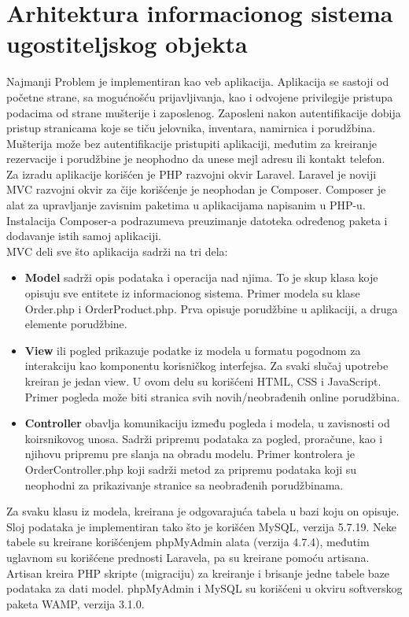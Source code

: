 \documentclass{article}
\begin{document}
\section{Arhitektura informacionog sistema ugostiteljskog objekta}
Najmanji Problem je implementiran kao veb aplikacija. Aplikacija se sastoji od početne strane, sa mogućnošću prijavljivanja, kao i odvojene privilegije pristupa podacima od strane mušterije i zaposlenog. Zaposleni nakon autentifikacije dobija pristup stranicama koje se tiču jelovnika, inventara, namirnica i porudžbina. Mušterija može bez autentifikacije pristupiti aplikaciji, međutim za kreiranje rezervacije i porudžbine je neophodno da unese mejl adresu ili kontakt telefon.\\

Za izradu aplikacije korišćen je PHP razvojni okvir Laravel. Laravel je noviji MVC razvojni okvir za čije korišćenje je neophodan je Composer. Composer je alat za upravljanje zavisnim paketima u aplikacijama napisanim u PHP-u. Instalacija Composer-a podrazumeva preuzimanje datoteka određenog paketa i dodavanje istih samoj aplikaciji.\\

MVC deli sve što aplikacija sadrži na tri dela:
\begin{itemize}
	\item \textbf{Model} sadrži opis podataka i operacija nad njima. To je skup klasa koje opisuju sve entitete iz informacionog sistema. Primer modela su klase Order.php i OrderProduct.php. Prva opisuje porudžbine u aplikaciji, a druga elemente porudžbine.
	\item \textbf{View} ili pogled prikazuje podatke iz modela u formatu pogodnom za interakciju kao komponentu korisničkog interfejsa. Za svaki slučaj upotrebe kreiran je jedan view. U ovom delu su korišćeni HTML, CSS i JavaScript. Primer pogleda može biti stranica svih novih/neobrađenih online porudžbina.
	\item \textbf{Controller} obavlja komunikaciju između pogleda i modela, u zavisnosti od koirsnikovog unosa. Sadrži pripremu podataka za pogled, proračune, kao i njihovu pripremu pre slanja na obradu modelu. Primer kontrolera je OrderController.php koji sadrži metod za pripremu podataka koji su neophodni za prikazivanje stranice sa neobrađenih porudžbinama.
\end{itemize}

Za svaku klasu iz modela, kreirana je odgovarajuća tabela u bazi koju on opisuje. Sloj podataka je implementiran tako što je korišćen MySQL, verzija 5.7.19. Neke tabele su kreirane korišćenjem phpMyAdmin alata (verzija 4.7.4), međutim uglavnom su korišćene prednosti Laravela, pa su kreirane pomoću artisana. Artisan kreira PHP skripte (migraciju) za kreiranje i brisanje jedne tabele baze podataka za dati model. phpMyAdmin i MySQL su korišćeni u okviru softverskog paketa WAMP, verzija 3.1.0.\\
\end{document}
